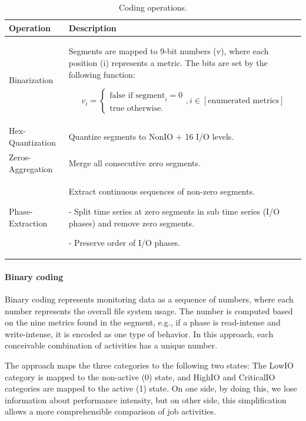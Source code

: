 \documentclass{jhps}
\begin{document}
\begin{table}[t]
 \centering
 \begin{tabularx}{\textwidth}{lX}
	 Operation &  Description \\
	 \midrule
	 Binarization & Segments are mapped to 9-bit numbers (v), where each position (i) represents a metric.
The bits are set by the following function:

	 \vbox{
		\begin{equation}
			v_i =
			\begin{cases}
				\text{false if segment}_i = 0\\\text{true otherwise.}
			\end{cases}, i \in [\text{enumerated metrics}]
		\end{equation}
	 } \\[-1em]
	 Hex-Quantization & Quantize segments to NonIO + 16 I/O levels.\\
	 Zeros-Aggregation & Merge all consecutive zero segments.\\
	 Phase-Extraction &  Extract continuous sequences of non-zero segments.
\par - Split time series at zero segments in sub time series (I/O phases) and remove zero segments.
\par - Preserve order of I/O phases.\\
 \end{tabularx}
 \caption{Coding operations.}
 \label{tab:coding_ops}
\end{table}

\paragraph{Binary coding}
Binary coding represents monitoring data as a sequence of numbers, where each number represents the overall file system usage.
The number is computed based on the nine metrics found in the segment, e.g., if a phase is read-intense and write-intense, it is encoded as one type of behavior.
In this approach, each conceivable combination of activities has a unique number.

The approach maps the three categories to the following two states: The LowIO category is mapped to the non-active (0) state, and HighIO and CriticalIO categories are mapped to the active (1) state.
On one side, by doing this, we lose information about performance intensity, but on other side, this simplification allows a more comprehensible comparison of job activities.
\end{document}
